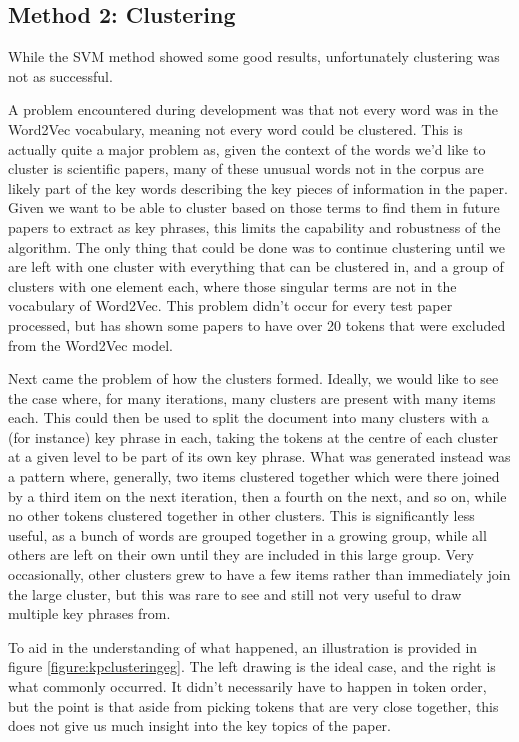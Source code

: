 \subsection{Method 2: Clustering}
While the SVM method showed some good results, unfortunately clustering was not as successful. 

A problem encountered during development was that not every word was in the Word2Vec vocabulary, meaning not every word could be clustered. This is actually quite a major problem as, given the context of the words we'd like to cluster is scientific papers, many of these unusual words not in the corpus are likely part of the key words describing the key pieces of information in the paper. Given we want to be able to cluster based on those terms to find them in future papers to extract as key phrases, this limits the capability and robustness of the algorithm. The only thing that could be done was to continue clustering until we are left with one cluster with everything that can be clustered in, and a group of clusters with one element each, where those singular terms are not in the vocabulary of Word2Vec. This problem didn't occur for every test paper processed, but has shown some papers to have over 20 tokens that were excluded from the Word2Vec model. 

Next came the problem of how the clusters formed. Ideally, we would like to see the case where, for many iterations, many clusters are present with many items each. This could then be used to split the document into many clusters with a (for instance) key phrase in each, taking the tokens at the centre of each cluster at a given level to be part of its own key phrase. What was generated instead was a pattern where, generally, two items clustered together which were there joined by a third item on the next iteration, then a fourth on the next, and so on, while no other tokens clustered together in other clusters. This is significantly less useful, as a bunch of words are grouped together in a growing group, while all others are left on their own until they are included in this large group. Very occasionally, other clusters grew to have a few items rather than immediately join the large cluster, but this was rare to see and still not very useful to draw multiple key phrases from.

To aid in the understanding of what happened, an illustration is provided in figure \ref{figure:kpclusteringeg}. The left drawing is the ideal case, and the right is what commonly occurred. It didn't necessarily have to happen in token order, but the point is that aside from picking tokens that are very close together, this does not give us much insight into the key topics of the paper.

